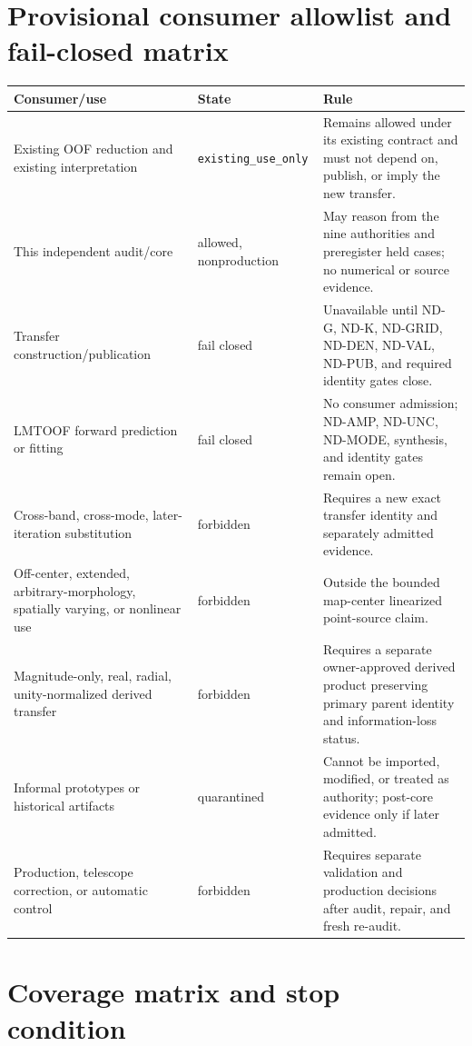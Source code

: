 \documentclass[11pt]{article}
\begin{document}
\section{Provisional consumer allowlist and fail-closed matrix}

\begin{longtable}{@{}L{0.24\textwidth}L{0.18\textwidth}L{0.49\textwidth}@{}}
\toprule
Consumer/use & State & Rule \\
\midrule
\endhead
Existing OOF reduction and existing interpretation &
\texttt{existing\_use\_only} & Remains allowed under its existing contract and
must not depend on, publish, or imply the new transfer. \\
This independent audit/core & allowed, nonproduction & May reason from the
nine authorities and preregister held cases; no numerical or source evidence. \\
Transfer construction/publication & fail closed & Unavailable until ND-G,
ND-K, ND-GRID, ND-DEN, ND-VAL, ND-PUB, and required identity gates close. \\
LMTOOF forward prediction or fitting & fail closed & No consumer admission;
ND-AMP, ND-UNC, ND-MODE, synthesis, and identity gates remain open. \\
Cross-band, cross-mode, later-iteration substitution & forbidden & Requires a
new exact transfer identity and separately admitted evidence. \\
Off-center, extended, arbitrary-morphology, spatially varying, or nonlinear
use & forbidden & Outside the bounded map-center linearized point-source claim. \\
Magnitude-only, real, radial, unity-normalized derived transfer & forbidden &
Requires a separate owner-approved derived product preserving primary parent
identity and information-loss status. \\
Informal prototypes or historical artifacts & quarantined & Cannot be imported,
modified, or treated as authority; post-core evidence only if later admitted. \\
Production, telescope correction, or automatic control & forbidden & Requires
separate validation and production decisions after audit, repair, and fresh
re-audit. \\
\bottomrule
\end{longtable}

\section{Coverage matrix and stop condition}
\end{document}
